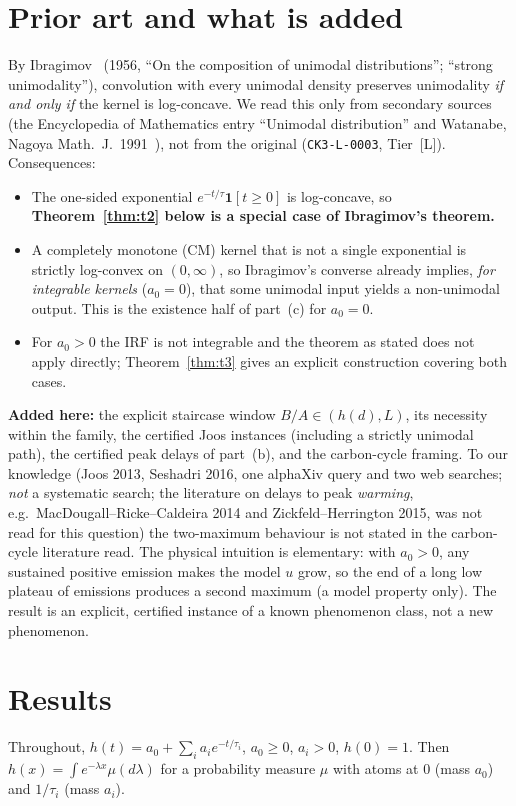 \documentclass[10pt]{article}
\newcommand{\tier}[1]{\textsf{[#1]}}
\newcommand{\tL}{\tier{L}}
\theoremstyle{plain}
\begin{document}
\section{Prior art and what is added}\label{sec:prior}
By Ibragimov~\cite{ibr} (1956, ``On the composition of unimodal distributions''; ``strong unimodality''), convolution with every unimodal density preserves unimodality \emph{if and only if} the kernel is log-concave. We read this only from secondary sources (the Encyclopedia of Mathematics entry ``Unimodal distribution'' and Watanabe, Nagoya Math.\ J.\ 1991~\cite{wat}), not from the original (\texttt{CK3-L-0003}, Tier~\tL{}). Consequences:
\begin{itemize}\itemsep=1pt
\item The one-sided exponential $e^{-t/\tau}\mathbf 1[t\ge0]$ is log-concave, so \textbf{Theorem~\ref{thm:t2} below is a special case of Ibragimov's theorem.}
\item A completely monotone (CM) kernel that is not a single exponential is strictly log-convex on $(0,\infty)$, so Ibragimov's converse already implies, \emph{for integrable kernels} ($a_0=0$), that some unimodal input yields a non-unimodal output. This is the existence half of part~(c) for $a_0=0$.
\item For $a_0>0$ the IRF is not integrable and the theorem as stated does not apply directly; Theorem~\ref{thm:t3} gives an explicit construction covering both cases.
\end{itemize}
\textbf{Added here:} the explicit staircase window $B/A\in(h(d),L)$, its necessity within the family, the certified Joos instances (including a strictly unimodal path), the certified peak delays of part~(b), and the carbon-cycle framing. To our knowledge (Joos 2013, Seshadri 2016, one alphaXiv query and two web searches; \emph{not} a systematic search; the literature on delays to peak \emph{warming}, e.g.\ MacDougall--Ricke--Caldeira 2014 and Zickfeld--Herrington 2015, was not read for this question) the two-maximum behaviour is not stated in the carbon-cycle literature read. The physical intuition is elementary: with $a_0>0$, any sustained positive emission makes the model $u$ grow, so the end of a long low plateau of emissions produces a second maximum (a model property only). The result is an explicit, certified instance of a known phenomenon class, not a new phenomenon.

\section{Results}\label{sec:results}
Throughout, $h(t)=a_0+\sum_ia_ie^{-t/\tau_i}$, $a_0\ge0$, $a_i>0$, $h(0)=1$. Then $h(x)=\int e^{-\lambda x}\mu(d\lambda)$ for a probability measure $\mu$ with atoms at $0$ (mass $a_0$) and $1/\tau_i$ (mass $a_i$).
\end{document}
